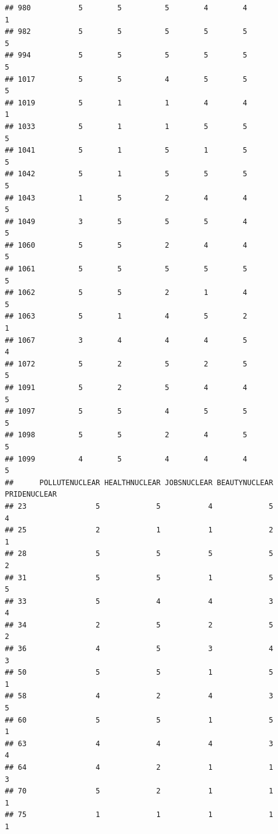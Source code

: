 \documentclass[
]{article}
\begin{document}
\begin{verbatim}
## 980           5        5          5        4        4               1
## 982           5        5          5        5        5               5
## 994           5        5          5        5        5               5
## 1017          5        5          4        5        5               5
## 1019          5        1          1        4        4               1
## 1033          5        1          1        5        5               5
## 1041          5        1          5        1        5               5
## 1042          5        1          5        5        5               5
## 1043          1        5          2        4        4               5
## 1049          3        5          5        5        4               5
## 1060          5        5          2        4        4               5
## 1061          5        5          5        5        5               5
## 1062          5        5          2        1        4               5
## 1063          5        1          4        5        2               1
## 1067          3        4          4        4        5               4
## 1072          5        2          5        2        5               5
## 1091          5        2          5        4        4               5
## 1097          5        5          4        5        5               5
## 1098          5        5          2        4        5               5
## 1099          4        5          4        4        4               5
##      POLLUTENUCLEAR HEALTHNUCLEAR JOBSNUCLEAR BEAUTYNUCLEAR PRIDENUCLEAR
## 23                5             5           4             5            4
## 25                2             1           1             2            1
## 28                5             5           5             5            2
## 31                5             5           1             5            5
## 33                5             4           4             3            4
## 34                2             5           2             5            2
## 36                4             5           3             4            3
## 50                5             5           1             5            1
## 58                4             2           4             3            5
## 60                5             5           1             5            1
## 63                4             4           4             3            4
## 64                4             2           1             1            3
## 70                5             2           1             1            1
## 75                1             1           1             1            1

\end{verbatim}
\end{document}

